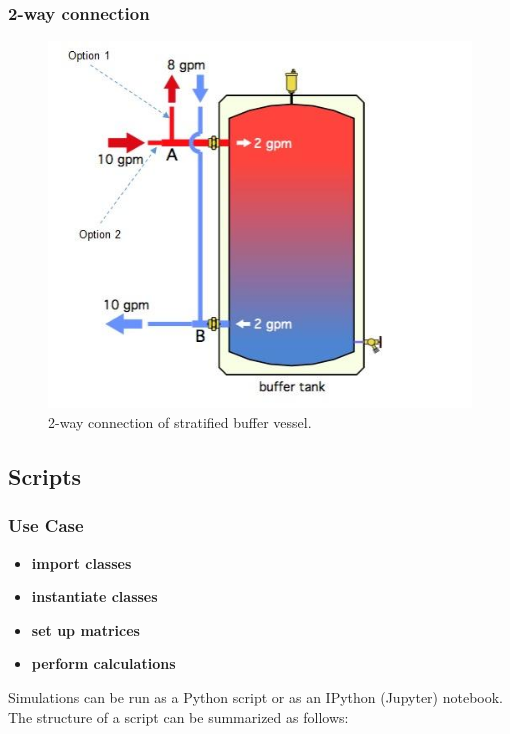 \subsubsection{2-way connection}

\begin{figure}[H]
	\centering
	\includegraphics[width=0.5\columnwidth]{Figures/2-way buffer connection}
	\caption[Short title]{2-way connection of stratified buffer vessel.}
	\label{fig:2way}
\end{figure} 

\subsection{Scripts}

\subsubsection{Use Case}

\begin{itemize}
	\item \textbf{import classes}
\end{itemize}

\begin{itemize}
	\item \textbf{instantiate classes}
\end{itemize}

\begin{itemize}
	\item \textbf{set up matrices}
\end{itemize}

\begin{itemize}
	\item \textbf{perform calculations}
\end{itemize}

Simulations can be run as a Python script or as an IPython (Jupyter) notebook. The structure of a script can be summarized as follows:

